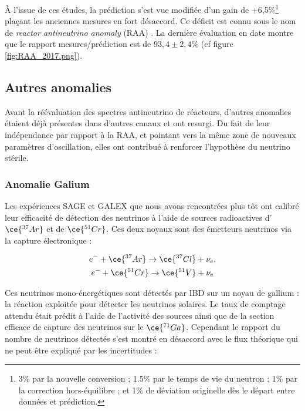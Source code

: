 À l'issue de ces études, la prédiction s'est vue modifiée d'un gain de +6,5\%\footnote{3\% par la nouvelle conversion ; 1.5\% par le temps de vie du neutron ; 1\% par la correction hors-équilibre ; et 1\% de déviation originelle dès le départ entre données et prédiction.} plaçant les anciennes mesures en fort désaccord. Ce déficit est connu sous le nom de \og \textit{reactor antineutrino anomaly} \fg{} (RAA) \cite{Mention:2011rk}. La dernière évaluation en date \cite{Gariazzo:2017fdh} montre que le rapport mesures/prédiction est de $93,4 \pm 2,4 \%$ (cf figure \ref{fig:RAA_2017.png}).

\bigbreak

\subsection{Autres anomalies}
\label{sec:other_anomalies}

Avant la réévaluation des spectres antineutrino de réacteurs, d'autres anomalies étaient déjà présentes dans d'autres canaux et ont resurgi. Du fait de leur indépendance par rapport à la RAA, et pointant vers la même zone de nouveaux paramètres d'oscillation, elles ont contribué à renforcer l'hypothèse du neutrino stérile.

\subsubsection*{Anomalie Galium}

Les expériences SAGE et GALEX que nous avons rencontrées plus tôt ont calibré leur efficacité de détection des neutrinos à l'aide de sources radioactives d'$\ce{^{37}Ar}$ et de $\ce{^{51}Cr}$. Ces deux noyaux sont des émetteurs neutrinos via la capture électronique :

\begin{equation}
\begin{gathered}
    e^- + \ce{^{37}Ar} \rightarrow \ce{^{37}Cl} + \nu_e, \\
    e^- + \ce{^{51}Cr} \rightarrow \ce{^{51}V} + \nu_e
\end{gathered}
\end{equation}

\bigbreak

Ces neutrinos mono-énergétiques sont détectés par IBD sur un noyau de gallium : la réaction exploitée pour détecter les neutrinos solaires. Le taux de comptage attendu était prédit à l'aide de l'activité des sources ainsi que de la section efficace de capture des neutrinos sur le $\ce{^{71}Ga}$. Cependant le rapport du nombre de neutrinos détectés s'est montré en désaccord avec le flux théorique qui ne peut être expliqué par les incertitudes \cite{Giunti:2010zu} :


